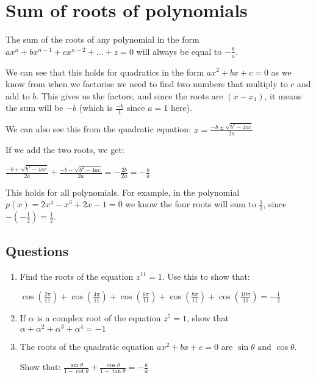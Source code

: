 \documentclass[../main.tex]{subfiles}
\begin{document}
\section{Sum of roots of polynomials}
The sum of the roots of any polynomial in the form \(ax^n+bx^{n-1}+cx^{n-2}+...+z=0\) will always be equal to \(-\frac{b}{a}\).

We can see that this holds for quadratics in the form \(ax^2+bx+c=0\) as we know from when we factorise we need to find two numbers that multiply to \(c\) and add to \(b\). This gives us the factors, and since the roots are \((x-x_1)\), it means the sum will be \(-b\) (which is \(\frac{-b}{1}\) since \(a=1\) here).

We can also see this from the quadratic equation:
\(x=\frac{-b\pm\sqrt{b^2-4ac}}{2a}\)

If we add the two roots, we get:

\(\frac{-b+\sqrt{b^2-4ac}}{2a}+\frac{-b-\sqrt{b^2-4ac}}{2a}=-\frac{2b}{2a}=-\frac{b}{a}\)

This holds for all polynomials. For example, in the polynomial \(p(x)=2x^4-x^3+2x-1=0\) we know the four roots will sum to \(\frac{1}{2}\), since \(-(-\frac{1}{2})=\frac{1}{2}\).

\pagebreak

\subsection*{Questions}
\label{Sum of roots}
\begin{enumerate}
    \item Find the roots of the equation \(z^{11}=1\). Use this to show that:
    
    \(\cos{(\frac{2\pi}{11})}+\cos{(\frac{4\pi}{11})+\cos{(\frac{6\pi}{11})+\cos{(\frac{8\pi}{11})+\cos{(\frac{10\pi}{11})=-\frac{1}{2}}}}}\)

    \item If \(\alpha\) is a complex root of the equation \(z^5=1 \), show that \(\alpha+\alpha^2+\alpha^3+\alpha^4=-1\)
    
    \item The roots of the quadratic equation \(ax^2+bx+c=0\) are \(\sin{\theta}\text{ and } \cos{\theta}\).
    
    Show that: \(\frac{\sin{\theta}}{1-\cot{\theta}}+\frac{\cos{\theta}}{1-\tan{\theta}}=-\frac{b}{a}\)
\end{enumerate}
\end{document}
